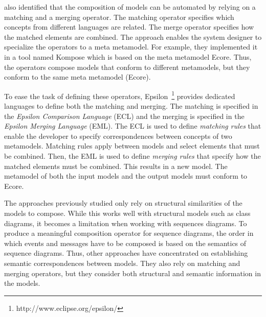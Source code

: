 \cite{kompose} also identified that the composition of models can be automated by relying on a matching and a merging operator. The matching operator specifies which concepts from different languages are related. The merge operator specifies how the matched elements are combined. The approach enables the system designer to specialize the operators to a meta metamodel. For example, they implemented it in a tool named Kompose which is based on the meta metamodel Ecore. Thus, the operators compose models that conform to different metamodels, but they conform to the same meta metamodel (\ie Ecore).

To ease the task of defining these operators, Epsilon~\cite{epsilon}\footnote{http://www.eclipse.org/epsilon/} provides dedicated languages to define both the matching and merging. The matching is specified in the \emph{Epsilon Comparison Language} (ECL) and the merging is specified in the \emph{Epsilon Merging Language} (EML). The ECL is used to define \emph{matching rules} that enable the developer to specify correspondences between concepts of two metamodels. Matching rules apply between models and select elements that must be combined. Then, the EML is used to define \emph{merging rules} that specify how the matched elements must be combined. This results in a new model. The metamodel of both the input models and the output models must conform to Ecore.



The approaches previously studied only rely on structural similarities of the models to compose. While this works well with structural models such as class diagrams, it becomes a limitation when working with sequences diagrams. To produce a meaningful composition operator for sequence diagrams, the order in which events and messages have to be composed is based on the semantics of sequence diagrams. Thus, other approaches have concentrated on establishing semantic correspondences between models. They also rely on matching and merging operators, but they consider both structural and semantic information in the models.  


